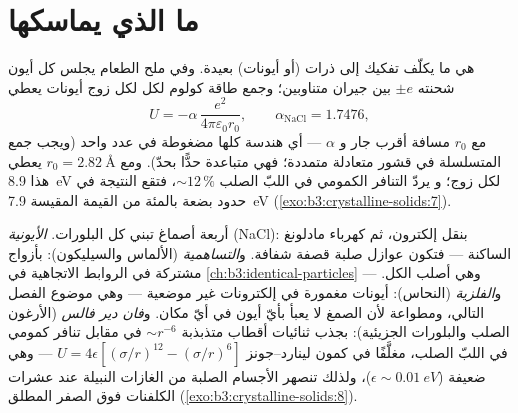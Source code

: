 \section{ما الذي يماسكها}

\begin{proposition}\label{prop:b3:crystalline-solids:madelung}
\emph{} هي ما يكلّف تفكيك 
إلى ذرات (أو أيونات) بعيدة. وفي ملح الطعام يجلس كل أيون شحنته
$\pm e$ بين جيران متناوبين؛ وجمع طاقة كولوم لكل
 لكل زوج أيونات يعطي
\[
U = -\alpha\,\frac{e^2}{4\pi\varepsilon_0 r_0} ,
\qquad \alpha_{\text{NaCl}} = 1.7476 ,
\]
مع $r_0$ مسافة أقرب جار و $\alpha$
\emph{} --- أي هندسة  كلها
مضغوطة في عدد واحد (ويجب جمع المتسلسلة في قشور
متعادلة متمددة؛ فهي متباعدة حدًّا بحدّ). ومع $r_0 =
\qty{2.82}{\angstrom}$ يعطي هذا \qty{8.9}{eV} لكل زوج؛ و
يردّ التنافر الكمومي في اللبّ الصلب $\sim12\,\%$، فتقع النتيجة في حدود
بضعة بالمئة من القيمة المقيسة \qty{7.9}{eV}
(\cref{exo:b3:crystalline-solids:7}).
\end{proposition}
\admitted

\begin{remark}\label{rem:b3:crystalline-solids:bonds}
أربعة أصماغ تبني كل البلورات. \emph{الأيونية} (NaCl): بنقل
إلكترون، ثم كهرباء مادلونغ الساكنة --- فتكون عوازل صلبة قصفة
شفافة. و\emph{التساهمية} (الألماس والسيليكون): بأزواج مشتركة
في الروابط الاتجاهية في
\cref{ch:b3:identical-particles} --- وهي أصلب الكل.
و\emph{الفلزية} (النحاس): أيونات مغمورة في إلكترونات غير موضعية ---
وهي موضوع الفصل التالي، ومطواعة لأن الصمغ لا يعبأ
بأيّ أيون في أيّ مكان. و\emph{فان دير فالس} (الأرغون الصلب والبلورات
الجزيئية): بجذب ثنائيات أقطاب متذبذبة $\sim r^{-6}$ في مقابل
تنافر كمومي في اللبّ الصلب، مغلَّفًا في كمون
لينارد--جونز $U = 4\epsilon[(\sigma/r)^{12} - (\sigma/r)^6]$ --- وهي ضعيفة
($\epsilon \sim \qty{0.01}{eV}$)، ولذلك تنصهر الأجسام الصلبة من الغازات النبيلة
عند عشرات الكلفنات فوق الصفر المطلق
(\cref{exo:b3:crystalline-solids:8}).
\end{remark}

